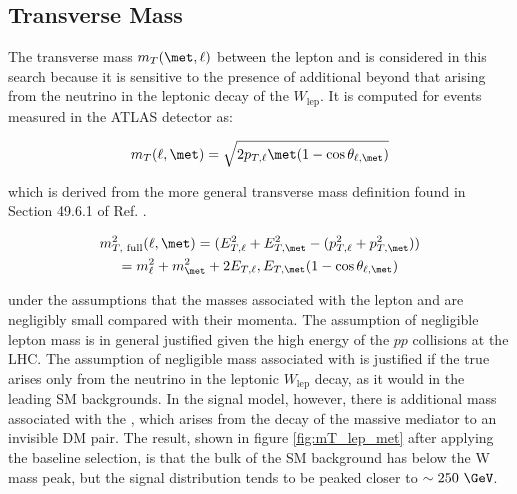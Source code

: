 \begin{figure}[H]
	\label{fig:minms_reco}
\end{figure}

\subsection{Transverse Mass}
\label{sec:transverse_mass}

The transverse mass \(m_T(\met, \ell)\) between the lepton and \met is considered in this search because it is sensitive to the presence of additional \met beyond that arising from the neutrino in the leptonic decay of the \(W_\text{lep}\). It is computed for events measured in the ATLAS detector as:

\begin{equation}
\label{eq:mtlepmet_atlas}
m_T(\ell, \met) = \sqrt{2p_{T, \ell} \met(1-\cos\theta_{\ell, \met})}
\end{equation}


\noindent which is derived from the more general transverse mass definition found in Section 49.6.1 of Ref. \cite{pdg_2020}.

\begin{multline}
\label{eq:mtlepmet_full}
m_{T, \text{ full}}^2(\ell, \met) = (E_{T, \ell}^2 + E_{T, \met}^2 - (p_{T, \ell}^2 + p_{T, \met}^2)) \\
= m_\ell^2+m_{\met}^2 + 2E_{T, \ell}, E_{T, \met}(1-\cos\theta_{\ell, \met})
\end{multline}

\noindent under the assumptions that the masses associated with the lepton and \met are negligibly small compared with their momenta. The assumption of negligible lepton mass is in general justified given the high energy of the \(pp\) collisions at the LHC. The assumption of negligible mass associated with \met is justified if the true \met arises only from the neutrino in the leptonic \(W_\text{lep}\) decay, as it would in the leading SM backgrounds. In the signal model, however, there is additional mass associated with the \met, which arises from the decay of the massive \Zprime mediator to an invisible DM pair. The result, shown in figure \ref{fig:mT_lep_met} after applying the baseline selection, is that the bulk of the SM background has \mtlepmet below the W mass peak, but the signal distribution tends to be peaked closer to \(\sim 250~\GeV\). 

